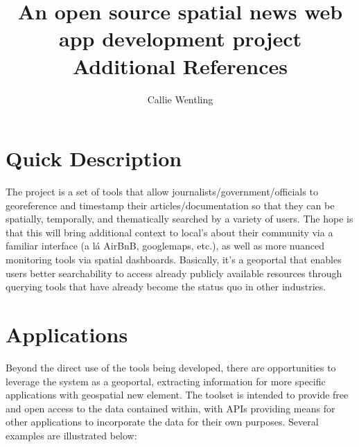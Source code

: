 \documentclass[11pt,usenames,dvipsnames]{article} %
\title{%
	An open source spatial news web app development project \\
	\large Additional References\\
}
\author{Callie Wentling}
\date{} %
\begin{document}

\maketitle
\thispagestyle{empty} %

\newpage
{}
\section*{Quick Description}
The project is a set of tools that allow journalists/government/officials to georeference and timestamp their articles/documentation so that they can be spatially, temporally, and thematically searched by a variety of users. The hope is that this will bring additional context to local’s about their community via a familiar interface (a lá AirBnB, googlemaps, etc.), as well as more nuanced monitoring tools via spatial dashboards. Basically, it’s a geoportal that enables users better searchability to access already publicly available resources through querying tools that have already become the status quo in other industries.


\newpage
\section*{Applications}\label{sec:applications}
Beyond the direct use of the tools being developed, there are opportunities to leverage the system as a geoportal, extracting information for more specific applications with geospatial new element. The toolset is intended to provide free and open access to the data contained within, with APIs providing means for other applications to incorporate the data for their own purposes. Several examples are illustrated below:
\end{document}
